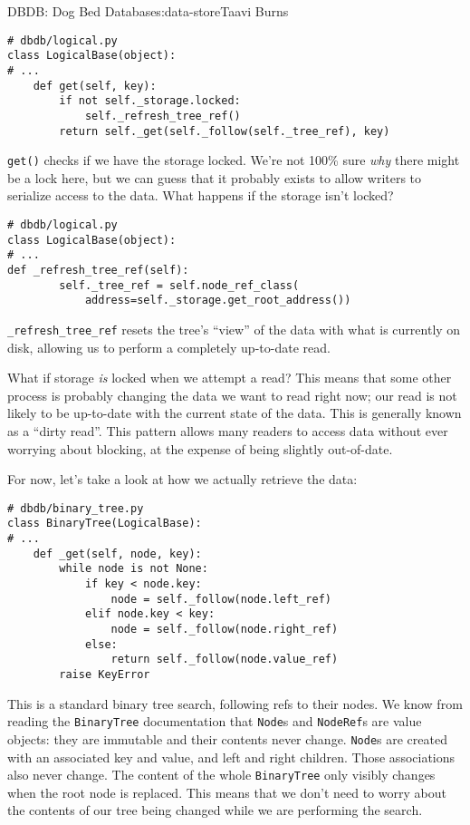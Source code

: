 \begin{aosachapter}{DBDB: Dog Bed Database}{s:data-store}{Taavi Burns}
\begin{verbatim}
# dbdb/logical.py
class LogicalBase(object):
# ...
    def get(self, key):
        if not self._storage.locked:
            self._refresh_tree_ref()
        return self._get(self._follow(self._tree_ref), key)
\end{verbatim}

\texttt{get()} checks if we have the storage locked. We're not 100\%
sure \emph{why} there might be a lock here, but we can guess that it
probably exists to allow writers to serialize access to the data. What
happens if the storage isn't locked?

\begin{verbatim}
# dbdb/logical.py
class LogicalBase(object):
# ...
def _refresh_tree_ref(self):
        self._tree_ref = self.node_ref_class(
            address=self._storage.get_root_address())
\end{verbatim}

\texttt{\_refresh\_tree\_ref} resets the tree's ``view'' of the data
with what is currently on disk, allowing us to perform a completely
up-to-date read.

What if storage \emph{is} locked when we attempt a read? This means that
some other process is probably changing the data we want to read right
now; our read is not likely to be up-to-date with the current state of
the data. This is generally known as a ``dirty read''. This pattern
allows many readers to access data without ever worrying about blocking,
at the expense of being slightly out-of-date.

For now, let's take a look at how we actually retrieve the data:

\begin{verbatim}
# dbdb/binary_tree.py
class BinaryTree(LogicalBase):
# ...
    def _get(self, node, key):
        while node is not None:
            if key < node.key:
                node = self._follow(node.left_ref)
            elif node.key < key:
                node = self._follow(node.right_ref)
            else:
                return self._follow(node.value_ref)
        raise KeyError
\end{verbatim}

This is a standard binary tree search, following refs to their nodes. We
know from reading the \texttt{BinaryTree} documentation that
\texttt{Node}s and \texttt{NodeRef}s are value objects: they are
immutable and their contents never change. \texttt{Node}s are created
with an associated key and value, and left and right children. Those
associations also never change. The content of the whole
\texttt{BinaryTree} only visibly changes when the root node is replaced.
This means that we don't need to worry about the contents of our tree
being changed while we are performing the search.


\end{aosachapter}
